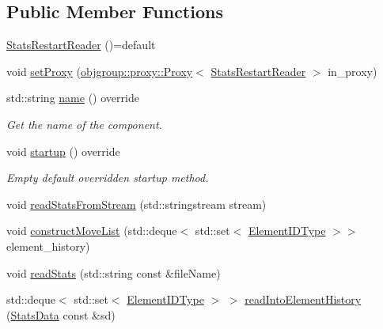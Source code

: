 \subsection*{Public Member Functions}
\begin{DoxyCompactItemize}
\item 
\hyperlink{structvt_1_1vrt_1_1collection_1_1balance_1_1_stats_restart_reader_a6813a4a484008c90cc12fb384e20f8c1}{Stats\+Restart\+Reader} ()=default
\item 
void \hyperlink{structvt_1_1vrt_1_1collection_1_1balance_1_1_stats_restart_reader_a17174042c0a87d1915ecb59315b09d52}{set\+Proxy} (\hyperlink{structvt_1_1objgroup_1_1proxy_1_1_proxy}{objgroup\+::proxy\+::\+Proxy}$<$ \hyperlink{structvt_1_1vrt_1_1collection_1_1balance_1_1_stats_restart_reader}{Stats\+Restart\+Reader} $>$ in\+\_\+proxy)
\item 
std\+::string \hyperlink{structvt_1_1vrt_1_1collection_1_1balance_1_1_stats_restart_reader_abb3373c0dd6e58b2089d9587cba71825}{name} () override
\begin{DoxyCompactList}\small\item\em Get the name of the component. \end{DoxyCompactList}\item 
void \hyperlink{structvt_1_1vrt_1_1collection_1_1balance_1_1_stats_restart_reader_a0a2bd4e4f989766216237d6aedfaaa51}{startup} () override
\begin{DoxyCompactList}\small\item\em Empty default overridden startup method. \end{DoxyCompactList}\item 
void \hyperlink{structvt_1_1vrt_1_1collection_1_1balance_1_1_stats_restart_reader_a16f224c5280bd10dc9494baad4e450e1}{read\+Stats\+From\+Stream} (std\+::stringstream stream)
\item 
void \hyperlink{structvt_1_1vrt_1_1collection_1_1balance_1_1_stats_restart_reader_a0bb3abf2d0d99caafd88c067e7c9498e}{construct\+Move\+List} (std\+::deque$<$ std\+::set$<$ \hyperlink{namespacevt_1_1vrt_1_1collection_1_1balance_a592736f733df4f90856df90a1fd08905}{Element\+I\+D\+Type} $>$$>$ element\+\_\+history)
\item 
void \hyperlink{structvt_1_1vrt_1_1collection_1_1balance_1_1_stats_restart_reader_a8eeb8ec940e2bd7e7e41bccf2462a4d6}{read\+Stats} (std\+::string const \&file\+Name)
\item 
std\+::deque$<$ std\+::set$<$ \hyperlink{namespacevt_1_1vrt_1_1collection_1_1balance_a592736f733df4f90856df90a1fd08905}{Element\+I\+D\+Type} $>$ $>$ \hyperlink{structvt_1_1vrt_1_1collection_1_1balance_1_1_stats_restart_reader_a95cee2dd4f9c5262fa44e102fd3b3767}{read\+Into\+Element\+History} (\hyperlink{structvt_1_1vrt_1_1collection_1_1balance_1_1_stats_data}{Stats\+Data} const \&sd)
$$
\end{DoxyCompactItemize}
